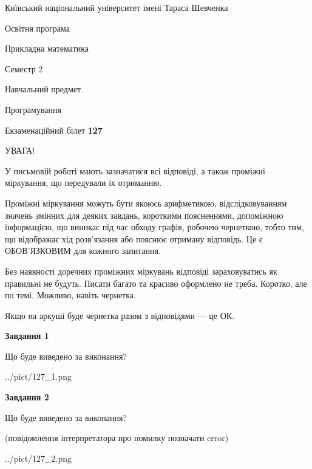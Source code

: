 \documentclass[12pt, ukrainian]{article}
\begin{document}
{{\begin {small}\par
{ \center  Київський національний університет імені Тараса Шевченка \par}
{\parbox {5 cm}{Освітня програма \hfill}{\parbox {7 cm}{Прикладна математика\hfill}}\parbox {6 cm}{\hfill Семестр 2}}\par
{\parbox {5 cm} {Навчальний предмет \hfill}\parbox {7 cm}{Програмування \hfill}\parbox {6cm}{\hfill}\par}\vspace{-7pt} \end{small}}{\center Екзаменаційний білет \No \textbf
{ 127 }\par}}
{
\begin {large}
УВАГА!

У письмовій роботі мають зазначатися всі відповіді, а також проміжні міркування, що передували їх отриманню.

Проміжні міркування можуть бути якоюсь арифметикою, відслідковуванням зна\-чень змінних для деяких завдань,
короткими поясненнями, допоміжною інформацією, що виникає під час обходу графів, робочею чернеткою,
тобто тим, що відображає хід розв’язання або пояснює отриману відповідь.
Це є ОБОВ’ЯЗКОВИМ для кожного запитання.

Без наявності доречних проміжних міркувань відповіді зараховуватись як правиль\-ні не будуть.
Писати багато та красиво оформлено не треба. Коротко, але по темі. Можли\-во, навіть чернетка.

Якщо на аркуші буде чернетка разом з відповідями --- це ОК.

\newpage

{\begin {center}\textbf{Завдання 1}\end {center}}\par
Що буде виведено за виконання?\par
\begin{center}
	{../pict/127_1.png}
\end{center}
\newpage

{\begin {center}\textbf{Завдання 2}\end {center}}\par
Що буде виведено за виконання?\par
 (повідомлення інтерпретатора про помилку позначати error)\par
\begin{center}
	{../pict/127_2.png}
\end{center}
\newpage


\end{large}}
\end{document}
